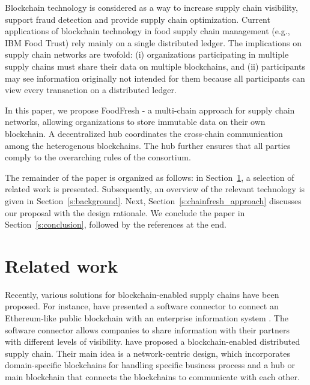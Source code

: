 \documentclass[conference]{IEEEtran}
\begin{document}
Blockchain technology is considered as a way to increase supply chain visibility, support fraud detection and provide supply chain optimization. Current applications of blockchain technology in food supply chain management (e.g., IBM Food Trust) rely mainly on a single distributed ledger. The implications on supply chain networks are twofold: (i) organizations participating in multiple supply chains must share their data on multiple blockchains, and (ii) participants may see information originally not intended for them because all participants can view every transaction on a distributed ledger. 

In this paper, we propose FoodFresh - a multi-chain approach for supply chain networks, allowing organizations to store immutable data on their own blockchain. A decentralized hub coordinates the cross-chain communication among the heterogenous blockchains.  The hub further ensures that all parties comply to the overarching rules of the consortium. 

The remainder of the paper is organized as follows: in Section~\ref{s:related_work}, a selection of related work is presented. Subsequently, an overview of the relevant technology is given in Section~\ref{s:background}. Next, Section~\ref{s:chainfresh_approach} discusses our proposal with the design rationale. We conclude the paper in Section~\ref{s:conclusion}, followed by the references at the end. 

\section{Related work} \label{s:related_work}
Recently, various solutions for blockchain-enabled supply chains have been proposed. For instance, \citeauthor{longo2019blockchain} have presented a software connector to connect an Ethereum-like public blockchain with an enterprise information system \cite{longo2019blockchain}. The software connector allows companies to share information with their partners with different levels of visibility. \citeauthor{schulz2018multichain} \cite{schulz2018multichain} have proposed a blockchain-enabled distributed supply chain. Their main idea is a network-centric design, which incorporates domain-specific blockchains for handling specific business process and a hub or main blockchain that connects the blockchains to communicate with each other. 
\end{document}

